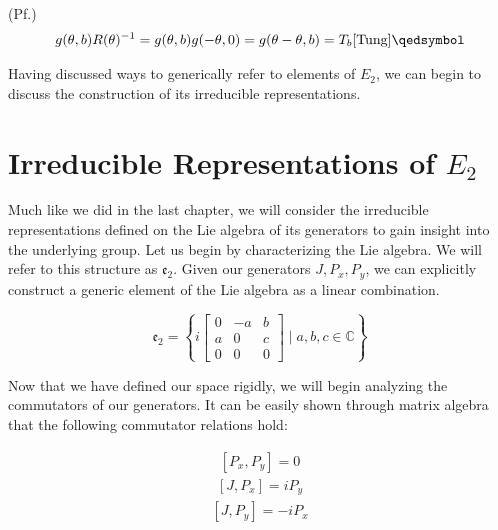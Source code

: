 \documentclass[10pt]{ucthesis}
\newcommand{\C}{\mathbb{C}}
\begin{document}
\noindent(Pf.) 
\begin{equation}
\begin{aligned}
g(\theta,b)R(\theta)^{-1} = g(\theta,b)g(-\theta,0) = g(\theta-\theta,b) = T_b \cite{Tung} \qedsymbol
\end{aligned}
\end{equation}

Having discussed ways to generically refer to elements of $E_2$, we can begin to discuss the construction of its irreducible representations.

\section{Irreducible Representations of $E_2$}

Much like we did in the last chapter, we will consider the irreducible representations defined on the Lie algebra of its generators to gain insight into the underlying group. Let us begin by characterizing the Lie algebra. We will refer to this structure as $\mathfrak{e_2}$. Given our generators $J, P_x,P_y$, we can explicitly construct a generic element of the Lie algebra as a linear combination.

$$\mathfrak{e_2} = \left\{i\begin{bmatrix}
								0 & -a & b \\
								a & 0 & c \\
								0 & 0 & 0
							 \end{bmatrix} \mid a,b,c \in \C\right\}$$

Now that we have defined our space rigidly, we will begin analyzing the commutators of our generators. It can be easily shown through matrix algebra that the following commutator relations hold:

\begin{equation}
\begin{aligned}
	[P_x,P_y] = 0
\end{aligned}
\end{equation}
\begin{equation}
\begin{aligned}
	[J,P_x] = iP_y
\end{aligned}
\end{equation}
\begin{equation}
\begin{aligned}
	[J,P_y] = -iP_x
\end{aligned}
\end{equation}
\end{document}
